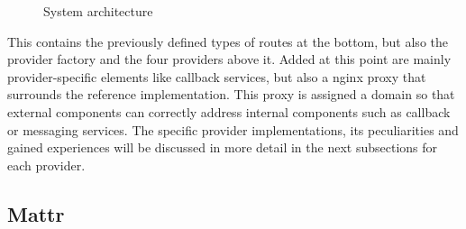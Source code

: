     \begin{figure}[ht]
	    \centering    	    
	    \makebox[\textwidth]{}       
	    \caption{System architecture}
        \label{figure: sys architecture}
    \end{figure}
    
    This contains the previously defined types of routes at the bottom, but also the provider factory and the four providers above it. Added at this point are mainly provider-specific elements like callback services, but also a nginx proxy that surrounds the reference implementation. This proxy is assigned a domain so that external components can correctly address internal components such as callback or messaging services. The specific provider implementations, its peculiarities and gained experiences will be discussed in more detail in the next subsections for each provider.
    
        \subsection{Mattr}
        
